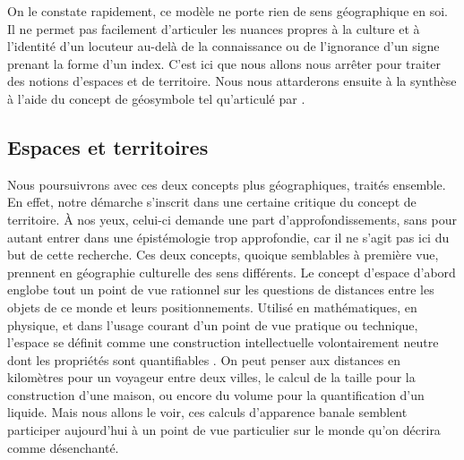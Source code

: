 On le constate rapidement, ce modèle ne porte  rien de sens géographique en soi.
Il ne permet pas facilement d'articuler les nuances propres à la culture et à l'identité d'un locuteur au-delà de la connaissance ou de l'ignorance d'un signe prenant la forme d'un index.
C'est ici que nous allons nous arrêter pour traiter des notions d'espaces et de territoire.
Nous nous attarderons ensuite à la synthèse à l'aide du concept de géosymbole tel qu'articulé par \citet{Bonnemaison1981}.


\subsection{Espaces et territoires}
\label{sec:espaces_et_territoires} Nous poursuivrons avec ces deux concepts plus géographiques, traités ensemble.
En effet, notre démarche s'inscrit dans une certaine critique du concept de territoire.
À nos yeux, celui-ci demande une part d'approfondissements,  sans pour autant entrer dans une épistémologie trop approfondie, car il ne s'agit pas ici du but de cette recherche.
Ces deux concepts, quoique semblables à première vue, prennent en géographie culturelle des sens différents.
Le concept d'espace d'abord englobe  tout un point de vue rationnel sur les questions de distances entre les objets de ce monde et leurs positionnements.
Utilisé en mathématiques, en physique, et dans l'usage courant d'un point de vue pratique ou technique, l'espace se définit comme une construction intellectuelle volontairement neutre dont les propriétés sont quantifiables .
On peut penser aux distances en kilomètres pour un voyageur entre deux villes, le calcul de la taille pour la construction d'une maison, ou encore du volume pour la quantification d'un liquide.
Mais nous allons le voir, ces calculs d'apparence banale semblent participer aujourd'hui à un point de vue particulier sur le monde qu'on décrira comme désenchanté.

